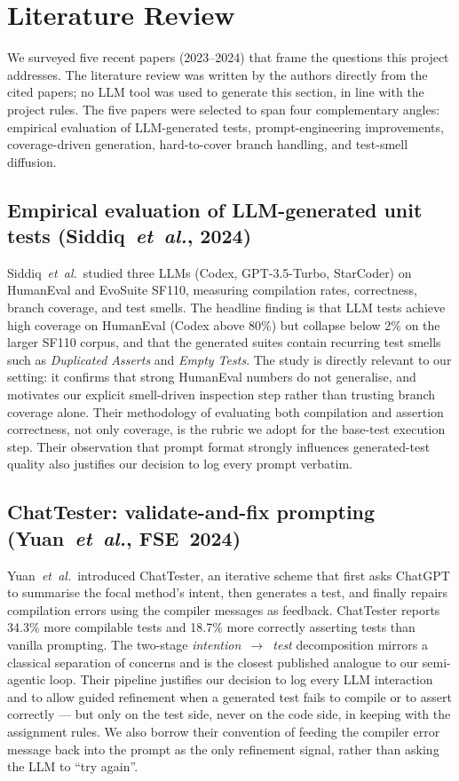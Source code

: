\documentclass[journal]{IEEEtran}
\begin{document}
\section{Literature Review}
\label{sec:bg}
We surveyed five recent papers (2023--2024) that frame the
questions this project addresses. The literature review was
written by the authors directly from the cited papers; no LLM
tool was used to generate this section, in line with the
project rules. The five papers were selected to span four
complementary angles: empirical evaluation of LLM-generated
tests, prompt-engineering improvements, coverage-driven
generation, hard-to-cover branch handling, and test-smell
diffusion.

\subsection{Empirical evaluation of LLM-generated unit tests
(Siddiq~\emph{et~al.}, 2024)~\cite{siddiq2024junit}}
Siddiq~\emph{et~al.}\ studied three LLMs (Codex, GPT-3.5-Turbo,
StarCoder) on HumanEval and EvoSuite SF110, measuring
compilation rates, correctness, branch coverage, and test
smells. The headline finding is that LLM tests achieve high
coverage on HumanEval (Codex above 80\%) but collapse below
2\% on the larger SF110 corpus, and that the generated suites
contain recurring test smells such as \emph{Duplicated Asserts}
and \emph{Empty Tests}. The study is directly relevant to our
setting: it confirms that strong HumanEval numbers do not
generalise, and motivates our explicit smell-driven inspection
step rather than trusting branch coverage alone. Their
methodology of evaluating both compilation and assertion
correctness, not only coverage, is the rubric we adopt for the
base-test execution step. Their observation that prompt format
strongly influences generated-test quality also justifies our
decision to log every prompt verbatim.

\subsection{ChatTester: validate-and-fix prompting
(Yuan~\emph{et~al.}, FSE~2024)~\cite{yuan2024chattester}}
Yuan~\emph{et~al.}\ introduced ChatTester, an iterative scheme
that first asks ChatGPT to summarise the focal method's intent,
then generates a test, and finally repairs compilation errors
using the compiler messages as feedback. ChatTester reports
34.3\% more compilable tests and 18.7\% more correctly
asserting tests than vanilla prompting. The two-stage
\emph{intention~$\to$~test} decomposition mirrors a classical
separation of concerns and is the closest published analogue
to our semi-agentic loop. Their pipeline justifies our
decision to log every LLM interaction and to allow guided
refinement when a generated test fails to compile or to assert
correctly --- but only on the test side, never on the code
side, in keeping with the assignment rules. We also borrow
their convention of feeding the compiler error message back
into the prompt as the only refinement signal, rather than
asking the LLM to ``try again''.
\end{document}
